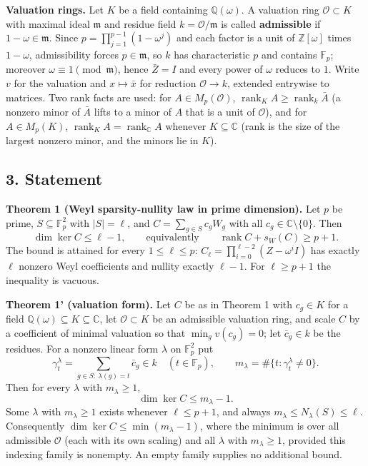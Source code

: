 \documentclass[
  11pt,
  a4paper,
]{article}
\newcounter{none} %
\begin{document}
\textbf{Valuation rings.} Let \(K\) be a field containing
\(\mathbb Q(\omega)\). A valuation ring \(\mathcal O\subset K\) with
maximal ideal \(\mathfrak m\) and residue field
\(k=\mathcal O/\mathfrak m\) is called \textbf{admissible} if
\(1-\omega\in\mathfrak m\). Since \(p=\prod_{j=1}^{p-1}(1-\omega^j)\)
and each factor is a unit of \(\mathbb Z[\omega]\) times \(1-\omega\),
admissibility forces \(p\in\mathfrak m\), so \(k\) has characteristic
\(p\) and contains \(\mathbb F_p\); moreover
\(\omega\equiv1\pmod{\mathfrak m}\), hence \(\bar Z=I\) and every power
of \(\omega\) reduces to \(1\). Write \(v\) for the valuation and
\(x\mapsto\bar x\) for reduction \(\mathcal O\to k\), extended entrywise
to matrices. Two rank facts are used: for \(A\in M_p(\mathcal O)\),
\(\operatorname{rank}_KA\ge\operatorname{rank}_k\bar A\) (a nonzero
minor of \(\bar A\) lifts to a minor of \(A\) that is a unit of
\(\mathcal O\)), and for \(A\in M_p(K)\),
\(\operatorname{rank}_KA=\operatorname{rank}_{\mathbb C}A\) whenever
\(K\subseteq\mathbb C\) (rank is the size of the largest nonzero minor,
and the minors lie in \(K\)).

\subsection{3. Statement}\label{statement}

\textbf{Theorem 1 (Weyl sparsity-nullity law in prime dimension).} Let
\(p\) be prime, \(S\subseteq\mathbb F_p^2\) with \(|S|=\ell\), and
\(C=\sum_{g\in S}c_gW_g\) with all \(c_g\in\mathbb C\setminus\{0\}\).
Then
\[\dim\ker C\le\ell-1,\qquad\text{equivalently}\qquad\operatorname{rank}C+s_W(C)\ge p+1.\]
The bound is attained for every \(1\le\ell\le p\):
\(C_\ell=\prod_{i=0}^{\ell-2}(Z-\omega^iI)\) has exactly \(\ell\)
nonzero Weyl coefficients and nullity exactly \(\ell-1\). For
\(\ell\ge p+1\) the inequality is vacuous.

\textbf{Theorem 1' (valuation form).} Let \(C\) be as in Theorem 1 with
\(c_g\in K\) for a field
\(\mathbb Q(\omega)\subseteq K\subseteq\mathbb C\), let
\(\mathcal O\subset K\) be an admissible valuation ring, and scale \(C\)
by a coefficient of minimal valuation so that \(\min_gv(c_g)=0\); let
\(\bar c_g\in k\) be the residues. For a nonzero linear form \(\lambda\)
on \(\mathbb F_p^2\) put
\[\gamma^\lambda_t=\sum_{g\in S:\ \lambda(g)=t}\bar c_g\in k\quad(t\in\mathbb F_p),\qquad m_\lambda=\#\{t:\gamma^\lambda_t\ne0\}.\]
Then for every \(\lambda\) with \(m_\lambda\ge1\),
\[\dim\ker C\le m_\lambda-1.\] Some \(\lambda\) with \(m_\lambda\ge1\)
exists whenever \(\ell\le p+1\), and always
\(m_\lambda\le N_\lambda(S)\le\ell\). Consequently
\(\dim\ker C\le\min(m_\lambda-1)\), where the minimum is over all
admissible \(\mathcal O\) (each with its own scaling) and all
\(\lambda\) with \(m_\lambda\ge1\), provided this indexing family is
nonempty. An empty family supplies no additional bound.
\end{document}
